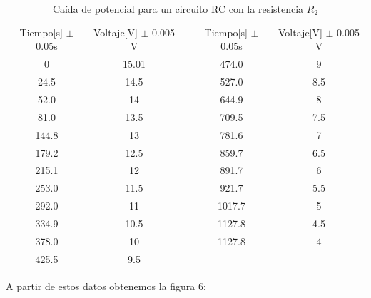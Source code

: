 \documentclass[10pt,letter]{article}
\begin{document}
\begin{table}[H]
\centering
\begin{tabular}{|c|c|ccc}
\cline{1-2} \cline{4-5}
Tiempo[s] $\pm$ 0.05s & Voltaje[V] $\pm$ 0.005 V & \multicolumn{1}{c|}{} & \multicolumn{1}{c|}{Tiempo[s] $\pm$ 0.05s} & \multicolumn{1}{c|}{Voltaje[V] $\pm$ 0.005 V} \\ \cline{1-2} \cline{4-5} 
0 & 15.01 & \multicolumn{1}{c|}{} & \multicolumn{1}{c|}{474.0} & \multicolumn{1}{c|}{9} \\ \cline{1-2} \cline{4-5} 
24.5 & 14.5 & \multicolumn{1}{c|}{} & \multicolumn{1}{c|}{527.0} & \multicolumn{1}{c|}{8.5} \\ \cline{1-2} \cline{4-5} 
52.0 & 14 & \multicolumn{1}{c|}{} & \multicolumn{1}{c|}{644.9} & \multicolumn{1}{c|}{8} \\ \cline{1-2} \cline{4-5} 
81.0 & 13.5 & \multicolumn{1}{c|}{} & \multicolumn{1}{c|}{709.5} & \multicolumn{1}{c|}{7.5} \\ \cline{1-2} \cline{4-5} 
144.8 & 13 & \multicolumn{1}{c|}{} & \multicolumn{1}{c|}{781.6} & \multicolumn{1}{c|}{7} \\ \cline{1-2} \cline{4-5} 
179.2 & 12.5 & \multicolumn{1}{c|}{} & \multicolumn{1}{c|}{859.7} & \multicolumn{1}{c|}{6.5} \\ \cline{1-2} \cline{4-5} 
215.1 & 12 & \multicolumn{1}{c|}{} & \multicolumn{1}{c|}{891.7} & \multicolumn{1}{c|}{6} \\ \cline{1-2} \cline{4-5} 
253.0 & 11.5 & \multicolumn{1}{c|}{} & \multicolumn{1}{c|}{921.7} & \multicolumn{1}{c|}{5.5} \\ \cline{1-2} \cline{4-5} 
292.0 & 11 & \multicolumn{1}{c|}{} & \multicolumn{1}{c|}{1017.7} & \multicolumn{1}{c|}{5} \\ \cline{1-2} \cline{4-5} 
334.9 & 10.5 & \multicolumn{1}{c|}{} & \multicolumn{1}{c|}{1127.8} & \multicolumn{1}{c|}{4.5} \\ \cline{1-2} \cline{4-5} 
378.0 & 10 & \multicolumn{1}{c|}{} & \multicolumn{1}{c|}{1127.8} & \multicolumn{1}{c|}{4} \\ \cline{1-2} \cline{4-5} 
425.5 & 9.5 &  &  &  \\ \cline{1-2}
\end{tabular}
\caption{Caída de potencial para un circuito RC con la resistencia $R_2$}
\end{table}

A partir de estos datos obtenemos la figura 6:
\end{document}
